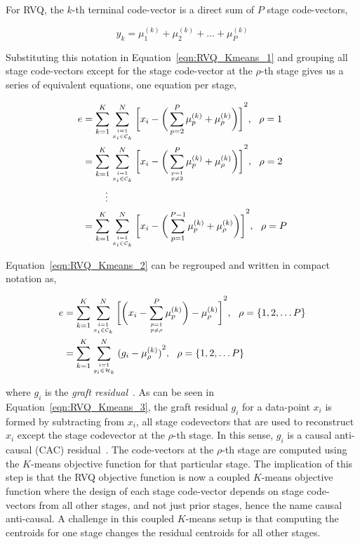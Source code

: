 \documentclass{article}
\begin{document}
For RVQ, the $k$-th terminal code-vector is a direct sum of $P$ stage code-vectors, 

\begin{equation}
y_k = \mu_1^{(k)} + \mu_2^{(k)} + \ldots + \mu_P^{(k)}
\end{equation}

Substituting this notation in Equation~\ref{eqn:RVQ_Kmeans_1} and grouping all stage code-vectors except for the stage code-vector at the $\rho$-th stage gives us a series of equivalent equations, one equation per stage,

\begin{align}
e&= \KmeansSum{\bigg[\RVQmultipleKmeansone\bigg]}^2, \ \ \rho=1\notag\\
&= \KmeansSum{\bigg[\RVQmultipleKmeanstwo\bigg]}^2, \ \ \rho=2\notag\\
&\ \ \ \  \ \ \ \vdots\notag\\
&=\KmeansSum{\bigg[\RVQmultipleKmeansT\bigg]}^2, \ \ \rho=P
\label{eqn:RVQ_Kmeans_2}
\end{align}

Equation~\ref{eqn:RVQ_Kmeans_2} can be regrouped and written in compact notation as,

\begin{align}
e&= \KmeansSum{\bigg[\RVQmultipleKmeansonealternate\bigg]}^2, \ \ \rho=\{1, 2, \ldots P\}\notag\\
&={\RVQerroralternate}, \ \ \rho=\{1, 2, \ldots P\}
\label{eqn:RVQ_Kmeans_3}
\end{align}																



where $g_i$ is the \emph{graft residual}~\cite{1993_JNL_RVQDSC_Barnes}.   As can be seen in Equation~\ref{eqn:RVQ_Kmeans_3}, the graft residual $g_i$ for a data-point $x_i$ is formed by subtracting from $x_i$, all stage codevectors that are used to reconstruct $x_i$ except the stage codevector at the $\rho$-th stage.  In this sense, $g_i$ is a causal anti-causal (CAC) residual~\cite{1993_JNL_RVQDSC_Barnes}.  The code-vectors at the $\rho$-th stage are computed using the $K$-means objective function for that particular stage.  The implication of this step is that the RVQ objective function is now a coupled $K$-means objective function where the design of each stage code-vector depends on stage code-vectors from all other stages, and not just prior stages, hence the name causal anti-causal.    A challenge in this coupled $K$-means setup is that computing the centroids for one stage changes the residual centroids for all other stages.  
\end{document}
